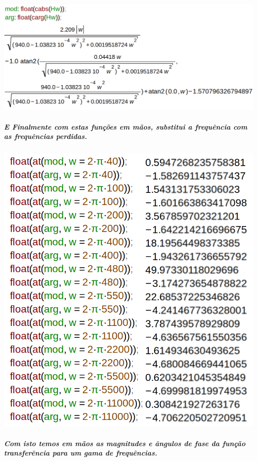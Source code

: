 \documentclass[12pt,twoside, a4paper, twocolumn]{article}
\begin{document}
\subparagraph*{}


\begin{adjustbox}{scale=0.21}
    \includegraphics{modarg.png}
\end{adjustbox}


\subparagraph*{E Finalmente com estas funções em mãos, substitui a frequência com as frequências perdidas.}


\subparagraph*{}


\begin{adjustbox}{scale=0.30}
    \includegraphics{resultados.png}
\end{adjustbox}


\subparagraph*{Com isto temos em mãos as magnitudes e ângulos de fase da função transferência para um gama de frequências.}
\end{document}
